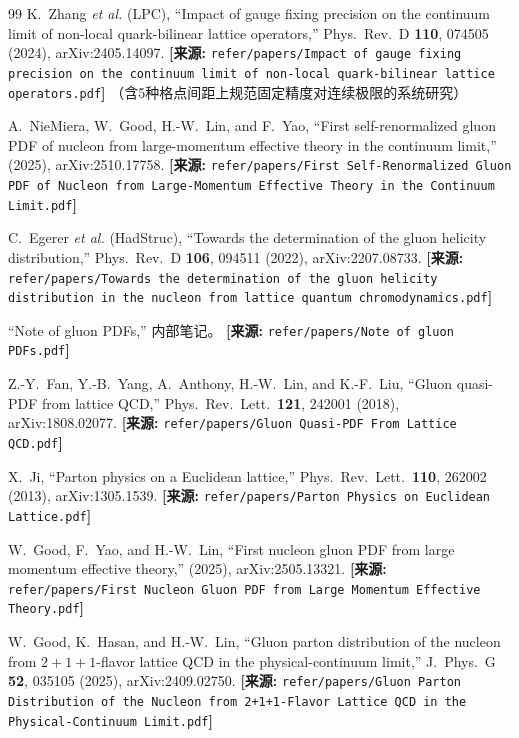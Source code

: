 \documentclass[12pt,a4paper]{ctexart}
\theoremstyle{definition}
\begin{document}
\begin{thebibliography}{99}
K.~Zhang \textit{et al.} (LPC),
``Impact of gauge fixing precision on the continuum limit of non-local quark-bilinear lattice operators,''
Phys.\ Rev.\ D \textbf{110}, 074505 (2024), arXiv:2405.14097.
\quad\textbf{[来源:} \texttt{refer/papers/Impact of gauge fixing precision on the continuum limit of non-local quark-bilinear lattice operators.pdf}\textbf{]}
（含5种格点间距上规范固定精度对连续极限的系统研究）

A.~NieMiera, W.~Good, H.-W.~Lin, and F.~Yao,
``First self-renormalized gluon PDF of nucleon from large-momentum effective theory in the continuum limit,''
(2025), arXiv:2510.17758.
\quad\textbf{[来源:} \texttt{refer/papers/First Self-Renormalized Gluon PDF of Nucleon from Large-Momentum Effective Theory in the Continuum Limit.pdf}\textbf{]}

C.~Egerer \textit{et al.} (HadStruc),
``Towards the determination of the gluon helicity distribution,''
Phys.\ Rev.\ D \textbf{106}, 094511 (2022), arXiv:2207.08733.
\quad\textbf{[来源:} \texttt{refer/papers/Towards the determination of the gluon helicity distribution in the nucleon from lattice quantum chromodynamics.pdf}\textbf{]}

``Note of gluon PDFs,'' 内部笔记。
\quad\textbf{[来源:} \texttt{refer/papers/Note of gluon PDFs.pdf}\textbf{]}

Z.-Y.~Fan, Y.-B.~Yang, A.~Anthony, H.-W.~Lin, and K.-F.~Liu,
``Gluon quasi-PDF from lattice QCD,''
Phys.\ Rev.\ Lett.\ \textbf{121}, 242001 (2018), arXiv:1808.02077.
\quad\textbf{[来源:} \texttt{refer/papers/Gluon Quasi-PDF From Lattice QCD.pdf}\textbf{]}

X.~Ji,
``Parton physics on a Euclidean lattice,''
Phys.\ Rev.\ Lett.\ \textbf{110}, 262002 (2013), arXiv:1305.1539.
\quad\textbf{[来源:} \texttt{refer/papers/Parton Physics on Euclidean Lattice.pdf}\textbf{]}

W.~Good, F.~Yao, and H.-W.~Lin,
``First nucleon gluon PDF from large momentum effective theory,''
(2025), arXiv:2505.13321.
\quad\textbf{[来源:} \texttt{refer/papers/First Nucleon Gluon PDF from Large Momentum Effective Theory.pdf}\textbf{]}

W.~Good, K.~Hasan, and H.-W.~Lin,
``Gluon parton distribution of the nucleon from $2+1+1$-flavor lattice QCD in the physical-continuum limit,''
J.\ Phys.\ G \textbf{52}, 035105 (2025), arXiv:2409.02750.
\quad\textbf{[来源:} \texttt{refer/papers/Gluon Parton Distribution of the Nucleon from 2+1+1-Flavor Lattice QCD in the Physical-Continuum Limit.pdf}\textbf{]}

\end{thebibliography}
\end{document}
